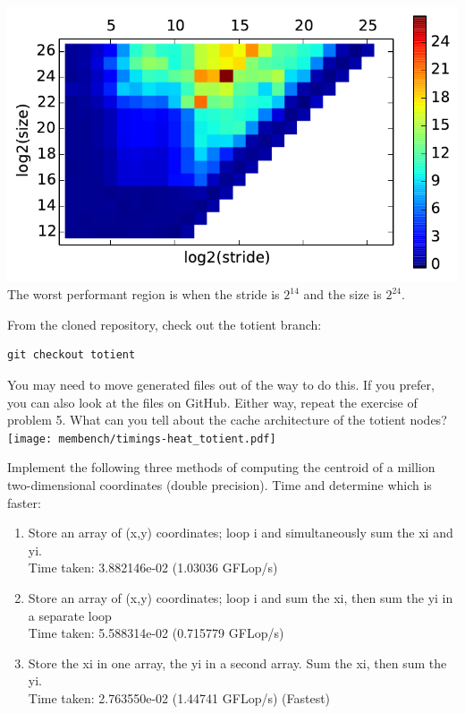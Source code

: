 \documentclass{5220hw}
\begin{document}
\begin{exercises}
\includegraphics[scale=0.9]{membench/timings-heat.pdf} \\
The worst performant region is when the stride is $2^{14}$ and the size is $2^{24}$. 
\item From the cloned repository, check out the totient branch:

\begin{lstlisting}
git checkout totient
\end{lstlisting}

You may need to move generated files out of the way to do this. If you prefer, you can also look at the files on GitHub. Either way, repeat the exercise of problem 5.  What can you tell about the cache architecture of the totient nodes? \\

\texttt{[image: membench/timings-heat\_totient.pdf]} \\

\item Implement the following three methods of computing the centroid of a million two-dimensional coordinates (double precision). Time and determine which is faster:

\begin{enumerate}
    \item  Store an array of (x,y) coordinates; loop i and simultaneously sum the xi and yi. \\
		Time taken: 3.882146e-02 (1.03036 GFLop/s)


    \item Store an array of (x,y) coordinates; loop i and sum the xi, then sum the yi in a separate loop \\
		Time taken: 5.588314e-02 (0.715779 GFLop/s)
		
    \item Store the xi in one array, the yi in a second array. Sum the xi, then sum the yi. \\
    		Time taken: 2.763550e-02 (1.44741 GFLop/s) (Fastest)
\end{enumerate}



\end{exercises}
\end{document}
